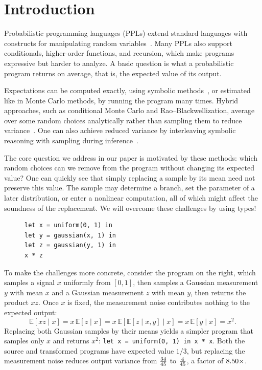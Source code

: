 \section{Introduction}
\label{sec:introduction}

Probabilistic programming languages (PPLs) extend standard languages with constructs for manipulating random variables~\cite{kozen1981semantics,gordon2014probabilistic,vandeMeent2018introduction,carpenter2017stan,bingham2019pyro,cusumano2019gen}. Many PPLs also support conditionals, higher-order functions, and recursion, which make programs expressive but harder to analyze. A basic question is what a probabilistic program returns on average, that is, the expected value of its output.

Expectations can be computed exactly, using symbolic methods~\cite{gehr2016psi,gehr2020lpsi,moosbrugger2022moment}, or estimated like in Monte Carlo methods, by running the program many times. Hybrid approaches, such as conditional Monte Carlo and Rao--Blackwellization, average over some random choices analytically rather than sampling them to reduce variance~\cite{casella1996rao,owen2013montecarlo}. One can also achieve reduced variance by interleaving symbolic reasoning with sampling during inference~\cite{murray2018delayed,atkinson2022semisymbolic}. 

The core question we address in our paper is motivated by these methods: which random choices can we remove from the program without changing its expected value? One can quickly see that simply replacing a sample by its mean need not preserve this value. The sample may determine a branch, set the parameter of a later distribution, or enter a nonlinear computation, all of which might affect the soundness of the replacement. We will overcome these challenges by using types!  

\begin{figure}
\vspace{-1.75em}
\begin{lstlisting}[xleftmargin=0pt]
let x = uniform(0, 1) in
let y = gaussian(x, 1) in
let z = gaussian(y, 1) in
x * z
\end{lstlisting}
\vspace{-2em}
\end{figure}
To make the challenges more concrete, consider the program on the right, which samples a signal $x$ uniformly
from $[0,1]$, then samples a Gaussian measurement $y$ with mean $x$ and a Gaussian measurement $z$ with mean $y$,
then returns the product $xz$. Once $x$ is fixed, the measurement
noise contributes nothing to the expected output:
$$
  \mathbb E[xz\mid x]
  =x\,\mathbb E[z\mid x]
  =x\,\mathbb E[\mathbb E[z\mid x,y]\mid x]
  =x\,\mathbb E[y\mid x]
  =x^2.
$$
Replacing both Gaussian samples by their means yields a simpler
program that samples only $x$ and returns $x^2$:
\lstinline{let x = uniform(0, 1) in x * x}. Both the source and transformed programs have
expected value $1/3$, but replacing the measurement noise reduces output
variance from $\frac{34}{45}$ to $\frac{4}{45}$, a factor
of $8.50\times$.

